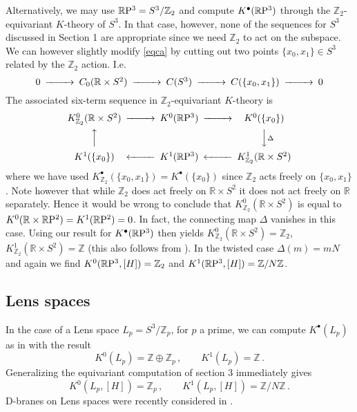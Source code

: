 \documentclass[a4paper,reqno]{amsart}
\theoremstyle{plain}
\theoremstyle{definition}
\theoremstyle{remark}
\numberwithin{equation}{section}
\numberwithin{figure}{section}
\newcommand{\RR}{{\mathbb R}}
\newcommand{\ZZ}{{\mathbb Z}}
\newcommand{\RP}{\RR {\rm P}}
\newcommand{\<}{\langle}
\renewcommand{\>}{\rangle}
\begin{document}
Alternatively, we may use $\RP^3=S^3/\ZZ_2$ and
compute $K^\bullet(\RP^3)$ through the $\ZZ_2$-equivariant $K$-theory
of $S^3$.  In that case, however, none of the sequences for $S^3$
discussed in Section 1 are appropriate since we need $\ZZ_2$ to act
on the subspace.  We can however slightly modify \eqref{eqca} by
cutting out two points $\{x_0,x_1\} \in S^3$ related by the $\ZZ_2$ action.
I.e.\
\begin{equation} \label{eqec}
\begin{CD}
0 @>>> C_0(\RR \times S^2) @>>> C(S^3) @>>> C(\{x_0,x_1\}) @>>> 0
\end{CD}
\end{equation}
The associated six-term sequence in $\ZZ_2$-equivariant $K$-theory
is
\begin{equation} \label{eqed}
\begin{CD}
K^0_{\ZZ_2}(\RR\times S^2) @>>> K^0(\RP^3) @>>>   K^0(\{x_0\}) \\
        @AAA        &               &                      @VV\Delta V \\
K^1(\{x_0\})   @<<< K^1(\RP^3) @<<<    K^1_{\ZZ_2}(\RR\times S^2)
\end{CD}
\end{equation}
where we have used $K^\bullet_{\ZZ_2}(\{x_0,x_1\}) =
K^\bullet(\{x_0\})$ since
$\ZZ_2$ acts freely on $\{x_0,x_1\}$.  Note however that while $\ZZ_2$
does act freely on $\RR\times S^2$ it does not act freely on $\RR$
separately.  Hence it would be wrong to conclude that
$K^0_{\ZZ_2}(\RR\times S^2)$ is equal to
$K^0(\RR\times \RP^2) = K^1(\RP^2) = 0$.  In fact, the connecting map
$\Delta$ vanishes in this case. Using our result for $K^\bullet(\RP^3)$
then yields
$K^0_{\ZZ_2}(\RR\times S^2) = \ZZ_2$, $K^1_{\ZZ_2}(\RR\times S^2) = \ZZ$
(this also follows from \cite[Prop. 2.4]{Kar}).  In the twisted case
$\Delta (m) = mN$ and again we find
$K^0(\RP^3,[H]) = \ZZ_2$ and $K^1(\RP^3,[H]) = \ZZ/N\ZZ$.


\subsection{Lens spaces}

In the case of a Lens space $L_p=S^3/\ZZ_p$, for $p$ a prime, we can
compute $K^\bullet(L_p)$ as in \cite{Ati} with the result
\begin{equation}
K^0(L_p) = \ZZ\oplus \ZZ_p\,,\qquad K^1(L_p)= \ZZ \,.
\end{equation}
Generalizing the equivariant computation of section 3 immediately gives
\begin{equation}
K^0(L_p,[H]) = \ZZ_p\,,\qquad K^1(L_p,[H])= \ZZ/N\ZZ \,.
\end{equation}
D-branes on Lens spaces were recently considered in \cite{MMS}.
\end{document}
